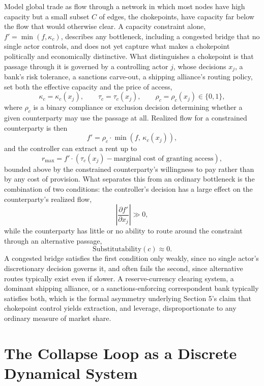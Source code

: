 \documentclass[11pt]{article}
\begin{document}
Model global trade as flow through a network in which most nodes have high capacity but a small subset $C$ of edges, the chokepoints, have capacity far below the flow that would otherwise clear. A capacity constraint alone, $f' = \min(f, \kappa_c)$, describes any bottleneck, including a congested bridge that no single actor controls, and does not yet capture what makes a chokepoint politically and economically distinctive. What distinguishes a chokepoint is that passage through it is governed by a controlling actor $j$, whose decisions $x_j$, a bank's risk tolerance, a sanctions carve-out, a shipping alliance's routing policy, set both the effective capacity and the price of access,
\[
\kappa_c = \kappa_c(x_j), \qquad \tau_c = \tau_c(x_j), \qquad \rho_c = \rho_c(x_j) \in \{0,1\},
\]
where $\rho_c$ is a binary compliance or exclusion decision determining whether a given counterparty may use the passage at all. Realized flow for a constrained counterparty is then
\[
f' = \rho_c \cdot \min\!\left(f, \, \kappa_c(x_j)\right),
\]
and the controller can extract a rent up to
\[
r_{\max} = f' \cdot \left(\tau_c(x_j) - \text{marginal cost of granting access}\right),
\]
bounded above by the constrained counterparty's willingness to pay rather than by any cost of provision. What separates this from an ordinary bottleneck is the combination of two conditions: the controller's decision has a large effect on the counterparty's realized flow,
\[
\left| \frac{\partial f'}{\partial x_j} \right| \gg 0,
\]
while the counterparty has little or no ability to route around the constraint through an alternative passage,
\[
\text{Substitutability}(c) \approx 0.
\]
A congested bridge satisfies the first condition only weakly, since no single actor's discretionary decision governs it, and often fails the second, since alternative routes typically exist even if slower. A reserve-currency clearing system, a dominant shipping alliance, or a sanctions-enforcing correspondent bank typically satisfies both, which is the formal asymmetry underlying Section 5's claim that chokepoint control yields extraction, and leverage, disproportionate to any ordinary measure of market share.

\section{The Collapse Loop as a Discrete Dynamical System}
\end{document}
